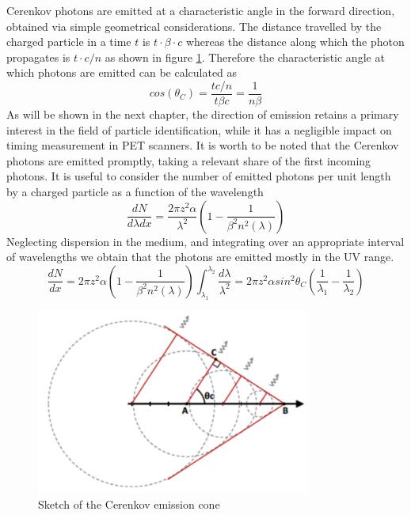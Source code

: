 Cerenkov photons are emitted at a characteristic angle in the forward direction, obtained via simple geometrical considerations. The distance travelled by the charged particle in a time $t$ is $t\cdot \beta \cdot c$ whereas the distance along which the photon propagates is $t\cdot c /n$ as shown in figure \ref{fig:cone}.
Therefore the characteristic angle at which photons are emitted can be calculated as
\begin{equation}
cos(\theta _{C}) = \frac{t c/n}{t \beta c} = \frac{1}{n\beta}
\end{equation}
As will be shown in the next chapter, the direction of emission retains a primary interest in the field of particle identification, while it has a negligible impact on timing measurement in PET scanners. It is worth to be noted that the Cerenkov photons are emitted promptly, taking a relevant share of the first incoming photons.  
It is useful to consider the number of emitted photons per unit length by a charged particle as a function of the wavelength
\begin{equation}
\frac{dN}{d\lambda dx} = \frac{2\pi z^{2}\alpha}{\lambda ^{2}}\left( 1 - \frac{1}{\beta ^{2}n^{2}(\lambda)} \right)
\end{equation}
Neglecting dispersion in the medium, and integrating over an appropriate interval of wavelengths we obtain that the photons are emitted mostly in the UV range.
\begin{equation}
\frac{dN}{dx} = 2\pi z^{2} \alpha \left( 1-\frac{1}{\beta ^{2} n^{2} (\lambda)}\right) \int _{\lambda _{1}} ^{\lambda _{2}} \frac{d\lambda}{\lambda ^{2}}  = 2\pi z^{2}\alpha sin^{2}\theta _{C} \left( \frac{1}{\lambda _{1}}-\frac{1}{\lambda _{2}}\right)
\label{eq:number}
\end{equation}
\begin{figure}[htbp]
\centering
\includegraphics[width=9cm]{../Pictures/Chapter_2/cone.pdf}
\caption[Cerenkov emission cone]{Sketch of the Cerenkov emission cone}
\label{fig:cone}
\end{figure}

